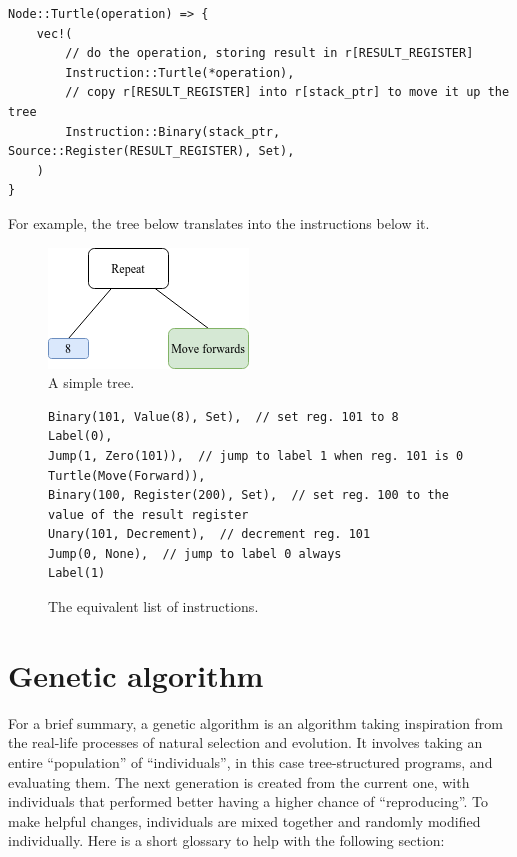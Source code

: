 \documentclass{report}
\begin{document}
\begin{verbatim}
Node::Turtle(operation) => {
    vec!(
        // do the operation, storing result in r[RESULT_REGISTER]
        Instruction::Turtle(*operation),
        // copy r[RESULT_REGISTER] into r[stack_ptr] to move it up the tree
        Instruction::Binary(stack_ptr, Source::Register(RESULT_REGISTER), Set),
    )
}
\end{verbatim}

For example, the tree below translates into the instructions below it.

\begin{figure}[ht]
    \centering
    \includegraphics{tree_3}
    \caption{A simple tree.}
\end{figure}

\begin{figure}[ht]
\begin{verbatim}
Binary(101, Value(8), Set),  // set reg. 101 to 8
Label(0),
Jump(1, Zero(101)),  // jump to label 1 when reg. 101 is 0
Turtle(Move(Forward)),
Binary(100, Register(200), Set),  // set reg. 100 to the value of the result register
Unary(101, Decrement),  // decrement reg. 101
Jump(0, None),  // jump to label 0 always
Label(1)
\end{verbatim}
\caption{The equivalent list of instructions.}
\end{figure}

\section{Genetic algorithm}

For a brief summary, a genetic algorithm is an algorithm taking inspiration from the real-life processes of natural selection and evolution. It involves taking an entire ``population'' of ``individuals'', in this case tree-structured programs, and evaluating them. The next generation is created from the current one, with individuals that performed better having a higher chance of ``reproducing''. To make helpful changes, individuals are mixed together and randomly modified individually. Here is a short glossary to help with the following section:
\end{document}
